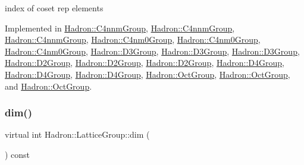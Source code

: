 index of coset rep elements 

Implemented in \mbox{\hyperlink{structHadron_1_1C4nnmGroup_a413031d9855013b22c493696c69a2c4d}{Hadron\+::\+C4nnm\+Group}}, \mbox{\hyperlink{structHadron_1_1C4nnmGroup_a413031d9855013b22c493696c69a2c4d}{Hadron\+::\+C4nnm\+Group}}, \mbox{\hyperlink{structHadron_1_1C4nnmGroup_a413031d9855013b22c493696c69a2c4d}{Hadron\+::\+C4nnm\+Group}}, \mbox{\hyperlink{structHadron_1_1C4nm0Group_abac118ef8b96cecf62143c917e23736e}{Hadron\+::\+C4nm0\+Group}}, \mbox{\hyperlink{structHadron_1_1C4nm0Group_abac118ef8b96cecf62143c917e23736e}{Hadron\+::\+C4nm0\+Group}}, \mbox{\hyperlink{structHadron_1_1C4nm0Group_abac118ef8b96cecf62143c917e23736e}{Hadron\+::\+C4nm0\+Group}}, \mbox{\hyperlink{structHadron_1_1D3Group_a361cfe22330be972fe6d49bc2e1af871}{Hadron\+::\+D3\+Group}}, \mbox{\hyperlink{structHadron_1_1D3Group_a361cfe22330be972fe6d49bc2e1af871}{Hadron\+::\+D3\+Group}}, \mbox{\hyperlink{structHadron_1_1D3Group_a361cfe22330be972fe6d49bc2e1af871}{Hadron\+::\+D3\+Group}}, \mbox{\hyperlink{structHadron_1_1D2Group_a41bfcefe5a659b99db790f822123593f}{Hadron\+::\+D2\+Group}}, \mbox{\hyperlink{structHadron_1_1D2Group_a41bfcefe5a659b99db790f822123593f}{Hadron\+::\+D2\+Group}}, \mbox{\hyperlink{structHadron_1_1D2Group_a41bfcefe5a659b99db790f822123593f}{Hadron\+::\+D2\+Group}}, \mbox{\hyperlink{structHadron_1_1D4Group_ae7ebfa25f82987479c33f0d5d769ab2f}{Hadron\+::\+D4\+Group}}, \mbox{\hyperlink{structHadron_1_1D4Group_ae7ebfa25f82987479c33f0d5d769ab2f}{Hadron\+::\+D4\+Group}}, \mbox{\hyperlink{structHadron_1_1D4Group_ae7ebfa25f82987479c33f0d5d769ab2f}{Hadron\+::\+D4\+Group}}, \mbox{\hyperlink{structHadron_1_1OctGroup_aeaabc93ad3df1b585bc1009b0bf4f5ba}{Hadron\+::\+Oct\+Group}}, \mbox{\hyperlink{structHadron_1_1OctGroup_aeaabc93ad3df1b585bc1009b0bf4f5ba}{Hadron\+::\+Oct\+Group}}, and \mbox{\hyperlink{structHadron_1_1OctGroup_aeaabc93ad3df1b585bc1009b0bf4f5ba}{Hadron\+::\+Oct\+Group}}.

\mbox{\label{structHadron_1_1LatticeGroup_abd8415698323796ef6a8605796ee3bea}} 
\subsubsection{\texorpdfstring{dim()}{dim()}\hspace{0.1cm}{\footnotesize\ttfamily [1/3]}}
{\footnotesize\ttfamily virtual int Hadron\+::\+Lattice\+Group\+::dim (\begin{DoxyParamCaption}{ }\end{DoxyParamCaption}) const\hspace{0.3cm}{\ttfamily [pure virtual]}}

